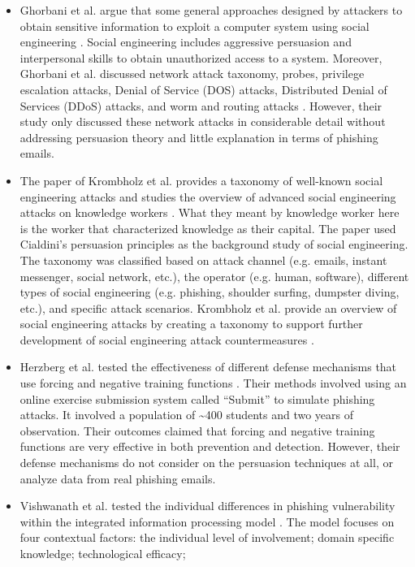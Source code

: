 \begin{itemize}
\item Ghorbani et al. argue that some general approaches designed by attackers
to obtain sensitive information to exploit a computer system using
social engineering \citep{Ghorbani20101}. Social engineering includes
aggressive persuasion and interpersonal skills to obtain unauthorized
access to a system. Moreover, Ghorbani et al. discussed network attack
taxonomy, probes, privilege escalation attacks, Denial of Service
(DOS) attacks, Distributed Denial of Services (DDoS) attacks, and
worm and routing attacks \citep{Ghorbani20101}. However, their study
only discussed these network attacks in considerable detail without
addressing persuasion theory and little explanation in terms of phishing
emails.
\item The paper of Krombholz et al. provides a taxonomy of well-known social
engineering attacks and studies the overview of advanced social engineering
attacks on knowledge workers \citep{krombholz2013social}. What they
meant by knowledge worker here is the worker that characterized knowledge
as their capital. The paper used Cialdini's persuasion principles
as the background study of social engineering. The taxonomy was classified
based on attack channel (e.g. emails, instant messenger, social network,
etc.), the operator (e.g. human, software), different types of social
engineering (e.g. phishing, shoulder surfing, dumpster diving, etc.),
and specific attack scenarios. Krombholz et al. provide an overview
of social engineering attacks by creating a taxonomy to support further
development of social engineering attack countermeasures \citep{krombholz2013social}. 
\item Herzberg et al. tested the effectiveness of different defense mechanisms
that use forcing and negative training functions \citep{herzberg2013forcing}.
Their methods involved using an online exercise submission system
called ``Submit'' to simulate phishing attacks. It involved a population
of \textasciitilde{}400 students and two years of observation. Their
outcomes claimed that forcing and negative training functions are
very effective in both prevention and detection. However, their defense
mechanisms do not consider on the persuasion techniques at all, or
analyze data from real phishing emails.
\item Vishwanath et al. tested the individual differences in phishing vulnerability
within the integrated information processing model \citep{vishwanath2011people}.
The model focuses on four contextual factors: the individual level
of involvement; domain specific knowledge; technological efficacy;

\end{itemize}
